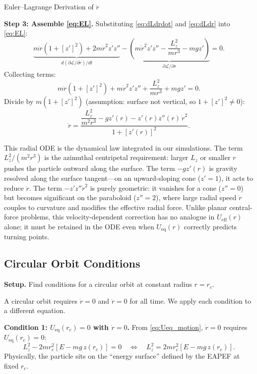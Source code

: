 \documentclass[11pt,letterpaper]{article}
\newcommand{\parhead}[1]{\par\medskip\noindent\textbf{#1}\ignorespaces}
\begin{document}
\begin{derivationbox}{Euler--Lagrange Derivation of $\ddot{r}$}
\parhead{Step 3: Assemble \eqref{eq:EL}.}
Substituting \eqref{eq:dLdrdot} and \eqref{eq:dLdr} into \eqref{eq:EL}:
\begin{equation}
    \underbrace{m\ddot{r}(1+[z']^2) + 2m\dot{r}^2 z' z''}_{d(\partial\mathcal{L}/\partial\dot{r})/dt}
    - \underbrace{\left(m\dot{r}^2 z' z'' - \frac{L_z^2}{m r^3} - mgz'\right)}_{\partial\mathcal{L}/\partial r} = 0.
\end{equation}
Collecting terms:
\begin{equation}
    m\ddot{r}(1+[z']^2) + m\dot{r}^2 z' z'' + \frac{L_z^2}{m r^3} + mgz' = 0.
\end{equation}
Divide by $m(1+[z']^2)$ (assumption: surface not vertical, so $1+[z']^2\ne 0$):
\begin{equation}\label{eq:rddot}
    \ddot{r}
    = \frac{\dfrac{L_z^2}{m^2 r^3} - g z'(r) - z'(r) z''(r)\,\dot{r}^2}
           {1 + [z'(r)]^2}.
\end{equation}
\end{derivationbox}

\begin{summarybox}
This radial ODE is the dynamical law integrated in our simulations. The term $L_z^2/(m^2r^3)$ is the azimuthal centripetal requirement: larger $L_z$ or smaller $r$ pushes the particle outward along the surface. The term $-gz'(r)$ is gravity resolved along the surface tangent---on an upward-sloping cone ($z'=1$), it acts to reduce $\ddot{r}$. The term $-z'z''\dot{r}^2$ is purely geometric: it vanishes for a cone ($z''=0$) but becomes significant on the paraboloid ($z''=2$), where large radial speed $\dot{r}$ couples to curvature and modifies the effective radial force. Unlike planar central-force problems, this velocity-dependent correction has no analogue in $U_{\mathrm{eff}}(r)$ alone; it must be retained in the ODE even when $U_{\mathrm{eq}}(r)$ correctly predicts turning points.
\end{summarybox}

\subsection{Circular Orbit Conditions}
\label{sec:circular}

\parhead{Setup.}
Find conditions for a circular orbit at constant radius $r=r_c$.

A circular orbit requires $\dot{r}=0$ and $\ddot{r}=0$ for all time. We apply each condition to a different equation.

\parhead{Condition 1: $U_{\mathrm{eq}}(r_c)=0$ with $\dot{r}=0$.}
From \eqref{eq:Ueq_motion}, $\dot{r}=0$ requires $U_{\mathrm{eq}}(r_c)=0$:
\begin{equation}\label{eq:circ_Ueq0}
    L_z^2 - 2m r_c^2\left[E - mg\,z(r_c)\right] = 0
    \quad\Longleftrightarrow\quad
    L_z^2 = 2m r_c^2\left[E - mg\,z(r_c)\right].
\end{equation}
Physically, the particle sits on the ``energy surface'' defined by the EAPEF at fixed $r_c$.
\end{document}
